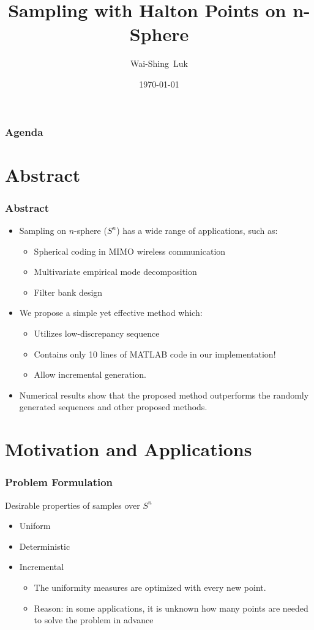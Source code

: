 \documentclass[serif]{beamer} %
\title[n-sphere]
{Sampling with Halton Points on n-Sphere}
\author[Luk]
{Wai-Shing~Luk\inst{1}} %
\institute[Fudan]
{ %
  \inst{1}%
  School of Microelectronics\\
  Fudan University
}
\date[\today] %
{\today} %
\begin{document}

\begin{frame}[fragile]
  \titlepage
\end{frame}

\begin{frame}
  \frametitle{Agenda}
  \tableofcontents
\end{frame}

\section{Abstract}
\begin{frame}[fragile]
\frametitle{Abstract}
\begin{itemize}
  \item Sampling on $n$-sphere ($S^n$) has a wide range of applications, such as:
      \begin{itemize}
        \item Spherical coding in MIMO wireless communication
        \item Multivariate empirical mode decomposition
        \item Filter bank design
      \end{itemize}
  \item We propose a simple yet effective method which:
      \begin{itemize}
        \item Utilizes low-discrepancy sequence
        \item Contains only 10 lines of MATLAB code in our implementation!
        \item Allow incremental generation.
      \end{itemize}
  \item Numerical results show that the proposed method outperforms the randomly generated sequences and other proposed methods.
\end{itemize}
\end{frame}

\section{Motivation and Applications}

\begin{frame}[fragile]
\frametitle{Problem Formulation}
Desirable properties of samples over $S^n$
\begin{itemize}
  \item Uniform
  \item Deterministic
  \item Incremental
  \begin{itemize}
    \item The uniformity measures are optimized with every new point.
    \item Reason: in some applications, it is unknown how many points are needed to solve the problem in advance
  \end{itemize}
\end{itemize}
\end{frame}
\end{document}
